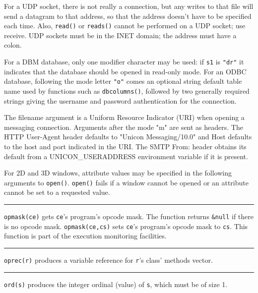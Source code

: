 For a UDP socket, there is not really a connection, but any writes to
that file will send a datagram to that address, so that the address
doesn't have to be specified each time. Also,
\texttt{read()} or \texttt{reads()} cannot be performed on a UDP
socket; use receive. UDP sockets must be in the INET domain; the
address must have a colon. 

For a DBM database, only one modifier character may be used: if
\texttt{s1} is \texttt{"dr"} it indicates that the database should be
opened in read-only mode.  For an ODBC database, following the mode
letter \texttt{"o"} comes an optional string default table name used
by functions such as \texttt{dbcolumns()}, followed by two generally
required strings giving the username and password authentication for the
connection.

The filename argument is a Uniform Resource Indicator (URI) when opening
a messaging connection. Arguments after the mode
"m" are sent as headers. The HTTP
User-Agent header defaults to "Unicon
Messaging/10.0" and Host defaults to the host and port
indicated in the URI. The SMTP From: header obtains its default from a
UNICON\_USERADDRESS environment variable if it is present.

For 2D and 3D windows, attribute values may be specified in the
following arguments to \texttt{open()}. \texttt{open()} fails if a
window cannot be opened or an attribute cannot be set to a requested
value.

\bigskip\hrule\vspace{0.1cm}

\noindent
\texttt{opmask(ce)} gets \texttt{ce}'s
program's opcode mask. The function returns
\texttt{\&null} if there is no opcode mask. \texttt{opmask(ce,cs)} sets
\texttt{ce}'s program's opcode mask
to \texttt{cs}. This function is part of the execution monitoring
facilities.

\bigskip\hrule\vspace{0.1cm}

\noindent
\texttt{oprec(r)} produces a variable reference for
\texttt{r}'s class' methods vector.

\bigskip\hrule\vspace{0.1cm}

\noindent
{}\texttt{ord(s)} produces the integer ordinal
(value) of \texttt{s}, which must be of size 1.

